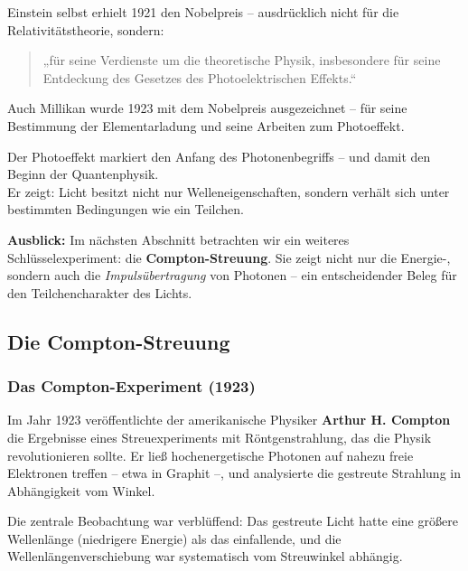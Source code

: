 Einstein selbst erhielt 1921 den Nobelpreis – ausdrücklich nicht für die Relativitätstheorie, sondern:
\begin{quote}
	„für seine Verdienste um die theoretische Physik, insbesondere für seine Entdeckung des Gesetzes des Photoelektrischen Effekts.“
\end{quote}

Auch Millikan wurde 1923 mit dem Nobelpreis ausgezeichnet – für seine Bestimmung der Elementarladung und seine Arbeiten zum Photoeffekt.

\medskip
\begin{tcolorbox}[hinweisbox, title=Fazit]
	\label{box:fazit der photo}
	\small
	Der Photoeffekt markiert den Anfang des Photonenbegriffs – und damit den Beginn der Quantenphysik.\\
	Er zeigt: Licht besitzt nicht nur Welleneigenschaften, sondern verhält sich unter bestimmten Bedingungen wie ein Teilchen.
\end{tcolorbox}
\medskip
\textbf{Ausblick:}  
Im nächsten Abschnitt betrachten wir ein weiteres Schlüsselexperiment: die \textbf{Compton-Streuung}. Sie zeigt nicht nur die Energie-, sondern auch die \emph{Impulsübertragung} von Photonen – ein entscheidender Beleg für den Teilchencharakter des Lichts.

\subsection{Die Compton-Streuung}

\subsubsection{Das Compton-Experiment (1923)}

Im Jahr 1923 veröffentlichte der amerikanische Physiker \textbf{Arthur H. Compton} die Ergebnisse eines Streuexperiments mit Röntgenstrahlung, das die Physik revolutionieren sollte. Er ließ hochenergetische Photonen auf nahezu freie Elektronen treffen – etwa in Graphit –, und analysierte die gestreute Strahlung in Abhängigkeit vom Winkel.

Die zentrale Beobachtung war verblüffend: Das gestreute Licht hatte eine größere Wellenlänge (niedrigere Energie) als das einfallende, und die Wellenlängenverschiebung war systematisch vom Streuwinkel abhängig.

